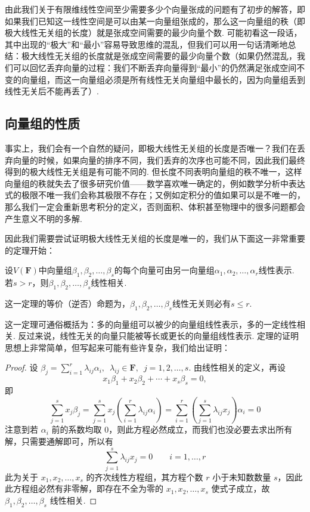 由此我们关于有限维线性空间至少需要多少个向量张成的问题有了初步的解答，即如果我们已知这一线性空间是可以由某一向量组张成的，那么这一向量组的秩（即极大线性无关组的长度）就是张成空间需要的最少向量个数. 可能初看这一段话，其中出现的``极大''和``最小''容易导致思维的混乱，但我们可以用一句话清晰地总结：极大线性无关组的长度就是张成空间需要的最少向量个数（如果仍然混乱，我们可以回忆丢弃向量的过程：我们不断丢弃向量得到``最小''的仍然满足张成空间不变的向量组，而这一向量组必须是所有线性无关向量组中最长的，因为向量组丢到线性无关后不能再丢了）.

\subsection{向量组的性质}

事实上，我们会有一个自然的疑问，即极大线性无关组的长度是否唯一？我们在丢弃向量的时候，如果向量的排序不同，我们丢弃的次序也可能不同，因此我们最终得到的极大线性无关组是有可能不同的. 但长度不同表明向量组的秩不唯一，这样向量组的秩就失去了很多研究价值——数学喜欢唯一确定的，例如数学分析中表达式的极限不唯一我们会称其极限不存在；又例如定积分的值如果可以是不唯一的，那么我们一定会重新思考积分的定义，否则面积、体积甚至物理中的很多问题都会产生意义不明的多解.

因此我们需要尝试证明极大线性无关组的长度是唯一的，我们从下面这一非常重要的定理开始：
\begin{theorem}\label{thm:3:线性表示}
    设$V(\mathbf{F})$中向量组$ \beta_1,\beta_2,\ldots,\beta_s $的每个向量可由另一向量组$\alpha_1,\alpha_2,\ldots,\alpha_r$线性表示. 若$s>r$，则$ \beta_1,\beta_2,\ldots,\beta_s $线性相关.
\end{theorem}
这一定理的等价（逆否）命题为，$ \beta_1,\beta_2,\ldots,\beta_s $线性无关则必有$s\leqslant r$.

这一定理可通俗概括为：多的向量组可以被少的向量组线性表示，多的一定线性相关. 反过来说，线性无关的向量只能被等长或更长的向量组线性表示. 定理的证明思想上非常简单，但写起来可能有些许复杂，我们给出证明：

\begin{proof}
    设 $\beta_j = \displaystyle\sum_{i = 1}^r \lambda_{ij} \alpha_i,\enspace \lambda_{ij} \in \mathbf{F},\enspace j = 1, 2, \ldots, s$. 由线性相关的定义，再设
    \[x_1\beta_1 + x_2\beta_2 + \cdots + x_s\beta_s = 0,\]
    即
    \[\sum_{j = 1}^s x_j\beta_j = \sum_{j = 1}^s x_j\left(\sum_{i = 1}^r \lambda_{ij} \alpha_i\right) = \sum_{i = 1}^r \left(\sum_{j = 1}^s \lambda_{ij}x_j\right)\alpha_i = 0\]
    注意到若 $\alpha_i$ 前的系数均取 $0$，则此方程必然成立，而我们也没必要去求出所有解，只需要通解即可，所以有
    \[\sum_{j = 1}^s \lambda_{ij}x_j = 0 \qquad i = 1, \ldots, r\]
    此为关于 $x_1, x_2, \ldots, x_s$ 的齐次线性方程组，其方程个数 $r$ 小于未知数数量 $s$，因此此方程组必然有非零解，即存在不全为零的 $x_1, x_2, \ldots, x_s$ 使式子成立，故 $ \beta_1,\beta_2,\ldots,\beta_s $ 线性相关.
\end{proof}

